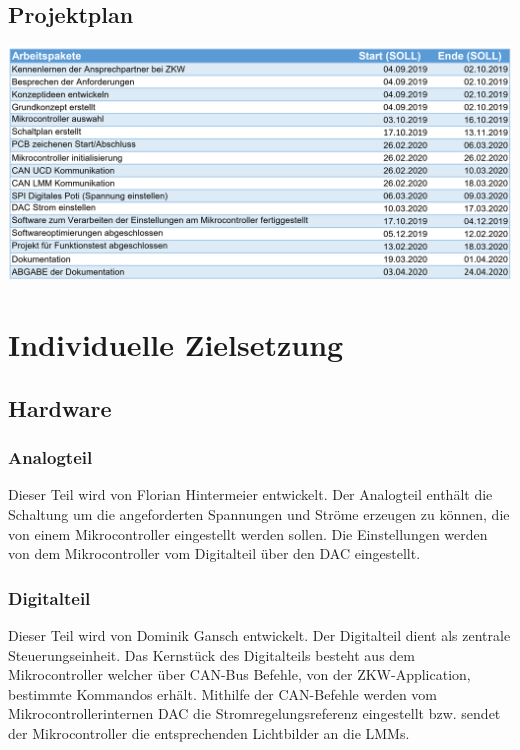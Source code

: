 \documentclass[paper=a4, 12pt]{scrreprt}
\begin{document}
	\section{Projektplan}\hfill \break
	\begin{adjustbox}{center,nofloat=figure,vspace=\bigskipamount}
		\includegraphics[width=\textwidth]{img/plan.PNG}
	\end{adjustbox}
	

\chapter{Individuelle Zielsetzung}\hfill \break
    \section{Hardware}    	\hfill \break
    	\subsection{Analogteil}\hfill \break
        Dieser Teil wird von Florian Hintermeier entwickelt. Der Analogteil enthält die Schaltung um die angeforderten Spannungen und Ströme erzeugen zu können, die von einem Mikrocontroller eingestellt werden sollen. Die Einstellungen werden von dem Mikrocontroller vom Digitalteil über den DAC eingestellt.
        
        \subsection{Digitalteil}\hfill \break
        Dieser Teil wird von Dominik Gansch entwickelt. Der Digitalteil dient als zentrale Steuerungseinheit. Das Kernstück des Digitalteils besteht aus dem Mikrocontroller welcher über CAN-Bus Befehle, von der ZKW-Application, bestimmte Kommandos erhält. Mithilfe der  CAN-Befehle werden vom Mikrocontrollerinternen DAC die Stromregelungsreferenz eingestellt bzw. sendet der Mikrocontroller die entsprechenden Lichtbilder an die LMMs.
\end{document}
